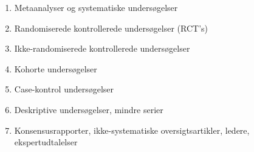 \begin{enumerate}
\item Metaanalyser og systematiske undersøgelser 
\item Randomiserede kontrollerede undersøgelser (RCT’s)
\item Ikke-randomiserede kontrollerede undersøgelser
\item Kohorte undersøgelser
\item Case-kontrol undersøgelser
\item Deskriptive undersøgelser, mindre serier
\item Konsensusrapporter, ikke-systematiske oversigtsartikler, ledere, ekspertudtalelser
\end{enumerate}

